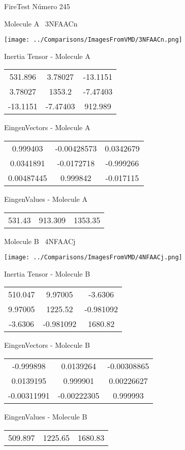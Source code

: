 \vtab[-3cm]
\begin{center}
{\large FireTest \tab Número 245}
\end{center}
\begin{multicols}{2}
\begin{center}

Molecule A \
3NFAACn

\texttt{[image: ../Comparisons/ImagesFromVMD/3NFAACn.png]}

Inertia Tensor - Molecule A \\
\begin{tabular}{|c c c|}
531.896	 & 	3.78027	 & 	-13.1151	 \\
3.78027	 & 	1353.2	 & 	-7.47403	 \\
-13.1151	 & 	-7.47403	 & 	912.989
\end{tabular}

\vtab
 EingenVectors - Molecule A     \\
\begin{tabular}{|c c c|}
0.999403	 & 	-0.00428573	 & 	0.0342679	 \\
0.0341891	 & 	-0.0172718	 & 	-0.999266	 \\
0.00487445	 & 	0.999842	 & 	-0.017115
\end{tabular}

\vtab
 EingenValues - Molecule A     \\
\begin{tabular}{|c c c|}
531.43	 & 	913.309	 & 	1353.35	 \\
\end{tabular}
\columnbreak

Molecule B \
4NFAACj

\texttt{[image: ../Comparisons/ImagesFromVMD/4NFAACj.png]}

Inertia Tensor - Molecule B \\
\begin{tabular}{|c c c|}
510.047	 & 	9.97005	 & 	-3.6306	 \\
9.97005	 & 	1225.52	 & 	-0.981092	 \\
-3.6306	 & 	-0.981092	 & 	1680.82
\end{tabular}

\vtab
 EingenVectors - Molecule B     \\
\begin{tabular}{|c c c|}
-0.999898	 & 	0.0139264	 & 	-0.00308865	 \\
0.0139195	 & 	0.999901	 & 	0.00226627	 \\
-0.00311991	 & 	-0.00222305	 & 	0.999993
\end{tabular}

\vtab
 EingenValues - Molecule B     \\
\begin{tabular}{|c c c|}
509.897	 & 	1225.65	 & 	1680.83	 \\
\end{tabular}

\end{center}
\end{multicols}

